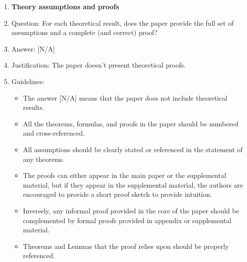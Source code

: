 \documentclass{llmxive}
\providecommand{\answerNA}[1][]{[N/A]#1}
\begin{document}
\begin{enumerate}
\item {\bf Theory assumptions and proofs}
    \item[] Question: For each theoretical result, does the paper provide the full set of assumptions and a complete (and correct) proof?
    \item[] Answer: \answerNA{}
    \item[] Justification: The paper doesn’t present theoretical proofs.
    \item[] Guidelines:
    \begin{itemize}
        \item The answer \answerNA{} means that the paper does not include theoretical results. 
        \item All the theorems, formulas, and proofs in the paper should be numbered and cross-referenced.
        \item All assumptions should be clearly stated or referenced in the statement of any theorems.
        \item The proofs can either appear in the main paper or the supplemental material, but if they appear in the supplemental material, the authors are encouraged to provide a short proof sketch to provide intuition. 
        \item Inversely, any informal proof provided in the core of the paper should be complemented by formal proofs provided in appendix or supplemental material.
        \item Theorems and Lemmas that the proof relies upon should be properly referenced. 
    \end{itemize}


\end{enumerate}
\end{document}
